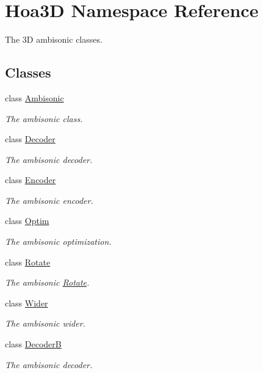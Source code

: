 \hypertarget{namespace_hoa3_d}{\section{Hoa3\-D Namespace Reference}
\label{namespace_hoa3_d}
}


The 3\-D ambisonic classes.  


\subsection*{Classes}
\begin{DoxyCompactItemize}
\item 
class \hyperlink{class_hoa3_d_1_1_ambisonic}{Ambisonic}
\begin{DoxyCompactList}\small\item\em The ambisonic class. \end{DoxyCompactList}\item 
class \hyperlink{class_hoa3_d_1_1_decoder}{Decoder}
\begin{DoxyCompactList}\small\item\em The ambisonic decoder. \end{DoxyCompactList}\item 
class \hyperlink{class_hoa3_d_1_1_encoder}{Encoder}
\begin{DoxyCompactList}\small\item\em The ambisonic encoder. \end{DoxyCompactList}\item 
class \hyperlink{class_hoa3_d_1_1_optim}{Optim}
\begin{DoxyCompactList}\small\item\em The ambisonic optimization. \end{DoxyCompactList}\item 
class \hyperlink{class_hoa3_d_1_1_rotate}{Rotate}
\begin{DoxyCompactList}\small\item\em The ambisonic \hyperlink{class_hoa3_d_1_1_rotate}{Rotate}. \end{DoxyCompactList}\item 
class \hyperlink{class_hoa3_d_1_1_wider}{Wider}
\begin{DoxyCompactList}\small\item\em The ambisonic wider. \end{DoxyCompactList}\item 
class \hyperlink{class_hoa3_d_1_1_decoder_b}{Decoder\-B}
\begin{DoxyCompactList}\small\item\em The ambisonic decoder. \end{DoxyCompactList}\end{DoxyCompactItemize}
